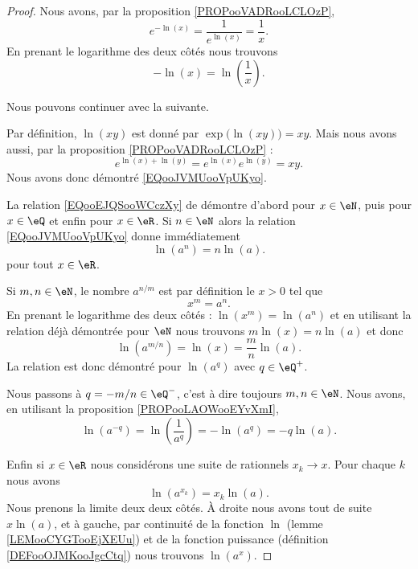 \begin{proof}
    Nous avons, par la proposition \ref{PROPooVADRooLCLOzP},
    \begin{equation}
        e^{-\ln(x)}=\frac{1}{  e^{\ln(x)} }=\frac{1}{ x }.
    \end{equation}
    En prenant le logarithme des deux côtés nous trouvons
    \begin{equation}
        -\ln(x)=\ln\left( \frac{1}{ x } \right).
    \end{equation}

    Nous pouvons continuer avec la suivante.

    Par définition, \( \ln(xy)\) est donné par \( \exp\big( \ln(xy) \big)=xy\). Mais nous avons aussi, par la proposition \ref{PROPooVADRooLCLOzP} :
    \begin{equation}
        e^{\ln(x)+\ln(y)}=e^{\ln(x)}e^{\ln(y)}=xy.
    \end{equation}
    Nous avons donc démontré \eqref{EQooJVMUooVpUKyo}.

    La relation \eqref{EQooEJQSooWCczXy} de démontre d'abord pour \( x\in \eN\), puis pour \( x\in \eQ\) et enfin pour \( x\in\eR\). Si \( n\in \eN\) alors la relation \eqref{EQooJVMUooVpUKyo} donne immédiatement
    \begin{equation}
        \ln(a^n)=n\ln(a).
    \end{equation}
    pour tout \( x\in \eR\).

    Si \( m,n\in \eN\), le nombre \( a^{n/m}\) est par définition le \( x>0\) tel que
    \begin{equation}
        x^m=a^n.
    \end{equation}
    En prenant le logarithme des deux côtés : \( \ln(x^m)=\ln(a^n)\) et en utilisant la relation déjà démontrée pour \( \eN\) nous trouvons \( m\ln(x)=n\ln(a)\) et donc
    \begin{equation}
        \ln(a^{m/n})=\ln(x)=\frac{ m }{ n }\ln(a).
    \end{equation}
    La relation est donc démontré pour \( \ln(a^q)\) avec \( q\in \eQ^+\).

    Nous passons à \( q=-m/n\in \eQ^-\), c'est à dire toujours \( m,n\in \eN\). Nous avons, en utilisant la proposition \ref{PROPooLAOWooEYvXmI},
    \begin{equation}
        \ln(a^{-q})=\ln(\frac{1}{ a^q })=-\ln(a^q)=-q\ln(a).
    \end{equation}

    Enfin si \( x\in \eR\) nous considérons une suite de rationnels \( x_k\to x\). Pour chaque \( k\) nous avons
    \begin{equation}
        \ln(a^{x_k})=x_k\ln(a).
    \end{equation}
    Nous prenons la limite deux deux côtés. À droite nous avons tout de suite \( x\ln(a)\), et à gauche, par continuité de la fonction \( \ln\) (lemme \ref{LEMooCYGTooEjXEUu}) et de la fonction puissance (définition \ref{DEFooOJMKooJgcCtq}) nous trouvons \( \ln(a^x)\).
\end{proof}

